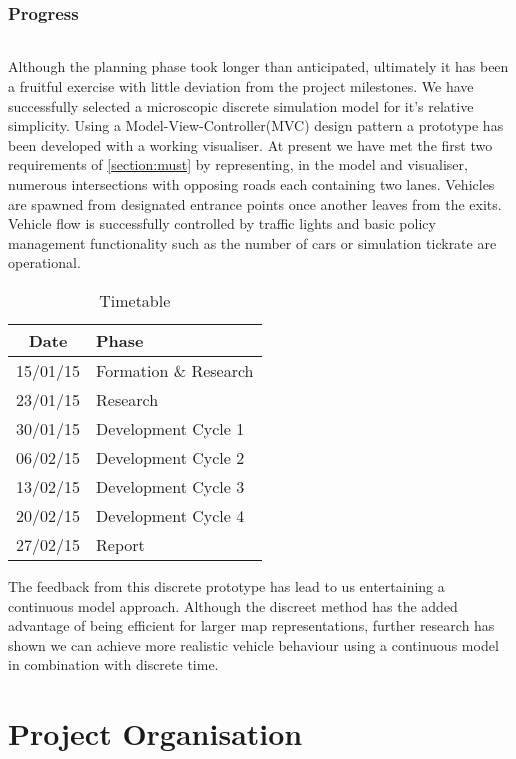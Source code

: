 \documentclass[11pt,a4paper]{article}
\begin{document}
\section{Progress}
\paragraph{}
Although the planning phase took longer than anticipated, ultimately it has been a fruitful exercise with little deviation from the project milestones.  We have successfully selected a microscopic discrete simulation model for it's relative simplicity.  Using a Model-View-Controller(MVC) design pattern a prototype has been developed with a working visualiser.  At present we have met the first two requirements of \ref{section:must} by representing, in the model and visualiser, numerous intersections with opposing roads each containing two lanes.  Vehicles are spawned from designated entrance points once another leaves from the exits.  Vehicle flow is successfully controlled by traffic lights and basic policy management functionality such as the number of cars or simulation tickrate are operational.
 
\begin{wraptable}{r}{6cm}
	\begin{tabular}{|c|l|}
	\hline
	\textbf{Date} & \textbf{Phase} \\ \hline
	15/01/15 & Formation \& Research \\ \hline
	23/01/15 & Research \\ \hline
	30/01/15 & Development Cycle 1 \\ \hline
	06/02/15 & Development Cycle 2 \\ \hline
	13/02/15 & Development Cycle 3 \\ \hline
	20/02/15 & Development Cycle 4 \\ \hline
	27/02/15 & Report \\ \hline
	\end{tabular}
	\caption{Timetable}
\end{wraptable}

The feedback from this discrete prototype has lead to us entertaining a continuous model approach.  Although the discreet method has the added advantage of being efficient for larger map representations, further research has shown we can achieve more realistic vehicle behaviour using a continuous model in combination with discrete time.


\part{Project Organisation}
\end{document}
